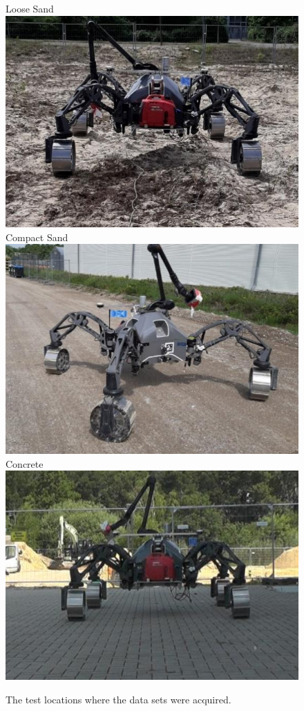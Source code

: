 \begin{figure}[!htb]
   \centering
    \subcaptionbox
        {Loose Sand}
        {\includegraphics[width=\columnwidth]{../figures/unprepsand.png}}
    \subcaptionbox
        {Compact Sand}
        {\includegraphics[width=\columnwidth]{../figures/compact.png}}
    \subcaptionbox
        {Concrete}
        {\includegraphics[width=\columnwidth]{../figures/concrete_v2.png}}
    \caption{The test locations where the data sets were acquired.}
    \label{fig:TestLocs}
\end{figure}

